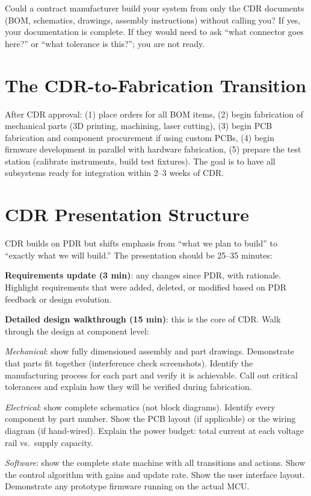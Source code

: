 \begin{tipbox}
Could a contract manufacturer build your system from only the CDR documents (BOM, schematics, drawings, assembly instructions) without calling you? If yes, your documentation is complete. If they would need to ask ``what connector goes here?'' or ``what tolerance is this?''; you are not ready.
\end{tipbox}

\section{The CDR-to-Fabrication Transition}
After CDR approval: (1) place orders for all BOM items, (2) begin fabrication of mechanical parts (3D printing, machining, laser cutting), (3) begin PCB fabrication and component procurement if using custom PCBs, (4) begin firmware development in parallel with hardware fabrication, (5) prepare the test station (calibrate instruments, build test fixtures). The goal is to have all subsystems ready for integration within 2--3 weeks of CDR.
\section{CDR Presentation Structure}
CDR builds on PDR but shifts emphasis from ``what we plan to build'' to ``exactly what we will build.'' The presentation should be 25--35 minutes:

\textbf{Requirements update (3 min)}: any changes since PDR, with rationale. Highlight requirements that were added, deleted, or modified based on PDR feedback or design evolution.

\textbf{Detailed design walkthrough (15 min)}: this is the core of CDR. Walk through the design at component level:

\emph{Mechanical}: show fully dimensioned assembly and part drawings. Demonstrate that parts fit together (interference check screenshots). Identify the manufacturing process for each part and verify it is achievable. Call out critical tolerances and explain how they will be verified during fabrication.

\emph{Electrical}: show complete schematics (not block diagrams). Identify every component by part number. Show the PCB layout (if applicable) or the wiring diagram (if hand-wired). Explain the power budget: total current at each voltage rail vs.\ supply capacity.

\emph{Software}: show the complete state machine with all transitions and actions. Show the control algorithm with gains and update rate. Show the user interface layout. Demonstrate any prototype firmware running on the actual MCU.

